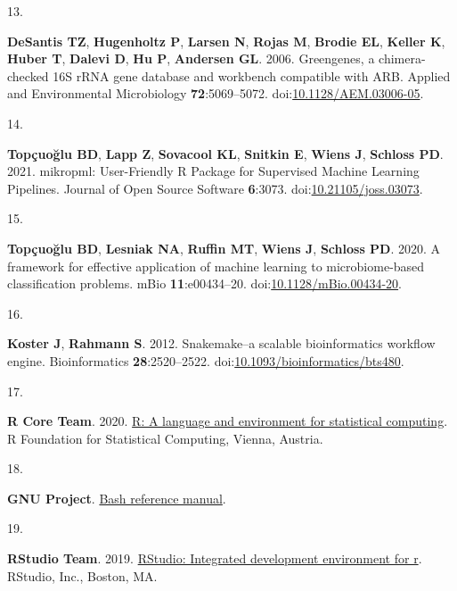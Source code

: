 \documentclass[
]{article}
\newlength{\cslhangindent}
\newlength{\csllabelwidth}
\newlength{\cslentryspacingunit} %
\newenvironment{CSLReferences}[2] %
 {%
  \setlength{\parindent}{0pt}
  \ifodd #1
  \let\oldpar\par
  \def\par{\hangindent=\cslhangindent\oldpar}
  \fi
  \setlength{\parskip}{#2\cslentryspacingunit}
 }%
 {}
\newcommand{\CSLLeftMargin}[1]{\parbox[t]{\csllabelwidth}{#1}}
\newcommand{\CSLRightInline}[1]{\parbox[t]{\linewidth - \csllabelwidth}{#1}\break}
\begin{document}
\begin{CSLReferences}{0}{1}
\leavevmode{}%
\CSLLeftMargin{13. }%
\CSLRightInline{\textbf{DeSantis TZ}, \textbf{Hugenholtz P},
\textbf{Larsen N}, \textbf{Rojas M}, \textbf{Brodie EL}, \textbf{Keller
K}, \textbf{Huber T}, \textbf{Dalevi D}, \textbf{Hu P}, \textbf{Andersen
GL}. 2006. Greengenes, a chimera-checked 16S rRNA gene database and
workbench compatible with ARB. Applied and Environmental Microbiology
\textbf{72}:5069--5072.
doi:\href{https://doi.org/10.1128/AEM.03006-05}{10.1128/AEM.03006-05}.}

\leavevmode{}%
\CSLLeftMargin{14. }%
\CSLRightInline{\textbf{Topçuoğlu BD}, \textbf{Lapp Z}, \textbf{Sovacool
KL}, \textbf{Snitkin E}, \textbf{Wiens J}, \textbf{Schloss PD}. 2021.
mikropml: User-Friendly R Package for Supervised Machine Learning
Pipelines. Journal of Open Source Software \textbf{6}:3073.
doi:\href{https://doi.org/10.21105/joss.03073}{10.21105/joss.03073}.}

\leavevmode{}%
\CSLLeftMargin{15. }%
\CSLRightInline{\textbf{Topçuoğlu BD}, \textbf{Lesniak NA},
\textbf{Ruffin MT}, \textbf{Wiens J}, \textbf{Schloss PD}. 2020. A
framework for effective application of machine learning to
microbiome-based classification problems. mBio \textbf{11}:e00434--20.
doi:\href{https://doi.org/10.1128/mBio.00434-20}{10.1128/mBio.00434-20}.}

\leavevmode{}%
\CSLLeftMargin{16. }%
\CSLRightInline{\textbf{Koster J}, \textbf{Rahmann S}. 2012.
Snakemake--a scalable bioinformatics workflow engine. Bioinformatics
\textbf{28}:2520--2522.
doi:\href{https://doi.org/10.1093/bioinformatics/bts480}{10.1093/bioinformatics/bts480}.}

\leavevmode{}%
\CSLLeftMargin{17. }%
\CSLRightInline{\textbf{R Core Team}. 2020.
\href{https://www.R-project.org/}{R: A language and environment for
statistical computing}. R Foundation for Statistical Computing, Vienna,
Austria.}

\leavevmode{}%
\CSLLeftMargin{18. }%
\CSLRightInline{\textbf{GNU Project}.
\href{https://www.gnu.org/software/bash/\%20manual/bash.html/}{Bash
reference manual}.}

\leavevmode{}%
\CSLLeftMargin{19. }%
\CSLRightInline{\textbf{RStudio Team}. 2019.
\href{http://www.rstudio.com/}{RStudio: Integrated development
environment for r}. RStudio, Inc., Boston, MA.}


\end{CSLReferences}
\end{document}
